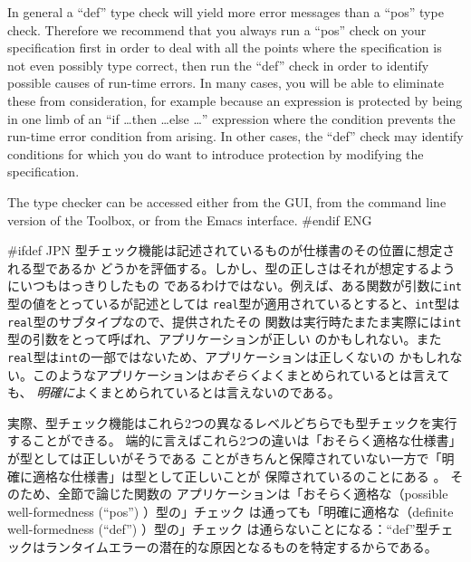 \documentclass[\pformat,12pt]{article}
\newcommand{\Toolbox}{Toolbox}
\newcommand{\Toolbox}{Toolbox}
\newcommand{\aaa}{\tt }
\begin{document}
In general a ``def'' type check will yield more error messages than
a ``pos'' type check. Therefore we recommend that you always run a ``pos''
check on your specification first in order to deal with all the points
where the specification is not even possibly type correct, then run the ``def''
check in order to identify possible causes of run-time errors. In many
cases, you will be able to eliminate these from consideration, for
example because an expression is protected by being in one limb of an
``if \ldots then \ldots else \ldots'' expression where the condition
prevents the run-time error condition from arising. In other cases,
the ``def'' check may identify conditions for which you do want to
introduce protection  by modifying the specification.

The type checker can be accessed either from the GUI, from the command
line version of the \Toolbox, or from the Emacs interface.
#endif ENG
  
#ifdef JPN
型チェック機能は記述されているものが仕様書のその位置に想定される型であるか
どうかを評価する。しかし、型の正しさはそれが想定するようにいつもはっきりしたもの
であるわけではない。例えば、ある関数が引数に{\aaa int}型の値をとっているが記述としては
{\aaa real}型が適用されているとすると、{\aaa int}型は{\aaa real}型のサブタイプなので、提供されたその
関数は実行時たまたま実際には{\aaa int}型の引数をとって呼ばれ、アプリケーションが正しい
のかもしれない。また{\aaa real}型は{\aaa int}の一部ではないため、アプリケーションは正しくないの
かもしれない。このようなアプリケーションは{\em おそらく\/}よくまとめられているとは言えても、
{\em 明確に\/}よくまとめられているとは言えないのである。

実際、型チェック機能はこれら2つの異なるレベルどちらでも型チェックを実行することができる。
端的に言えばこれら2つの違いは「おそらく適格な仕様書」が型としては正しいがそうである
ことがきちんと保障されていない一方で「明確に適格な仕様書」は型として正しいことが
保障されているのことにある
。
そのため、全節で論じた関数の
アプリケーションは「おそらく適格な（possible well-formedness (``pos'') ）型の」チェック 
は通っても「明確に適格な（definite well-formedness (``def'') ）型の」チェック 
は通らないことになる：``def''型チェックはランタイムエラーの潜在的な原因となるものを特定するからである。
\end{document}

